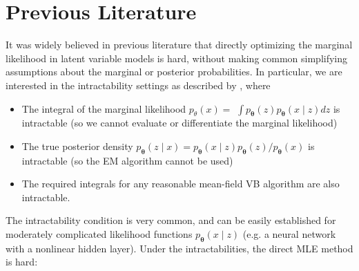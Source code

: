 \section{Previous Literature}
It was widely believed in previous literature that directly optimizing the marginal likelihood in latent variable models is hard, without making common simplifying assumptions about the marginal or posterior probabilities. In particular, we are interested in the intractability settings as described by \cite{vae}, where

\begin{itemize}
\item The integral of the marginal likelihood $p_\theta(x)=$ $\int p_{\boldsymbol{\theta}}(z) p_{\boldsymbol{\theta}} \left(x \mid z\right) d z$ is intractable (so we cannot evaluate or differentiate the marginal likelihood)
\item The true posterior density $p_{\boldsymbol{\theta}}\left(z \mid x\right)=p_{\boldsymbol{\theta}}(x \mid z) p_{\boldsymbol{\theta}}(z) / p_{\boldsymbol{\theta}}(x)$ is intractable (so the EM algorithm cannot be used)
\item The required integrals for any reasonable mean-field VB algorithm are also intractable.
\end{itemize}

The intractability condition is very common, and can be easily established for moderately complicated likelihood functions $p_{\boldsymbol{\theta}}(x \mid z)$ (e.g. a neural network with a nonlinear hidden layer). Under the intractabilities, the direct MLE method is hard:


